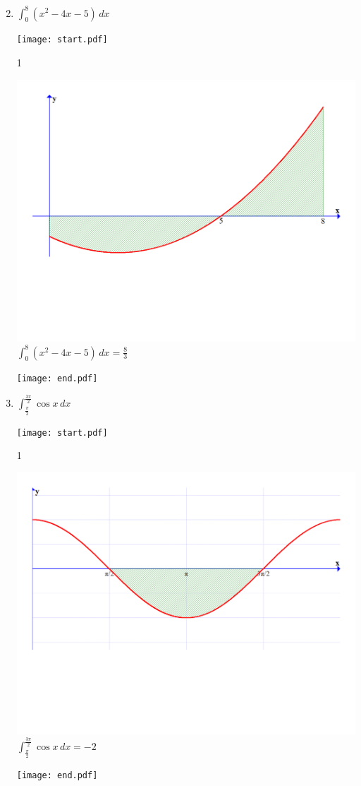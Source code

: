 \documentclass[12pt]{article}
\begin{document}
\newpage


\begin{enumerate}
\setcounter{enumi}{1}

\item $\int_0^8{(x^2-4x-5)}\,dx$

\texttt{[image: start.pdf]}
{{{1\linewidth}{\begin{center}\includegraphics[scale=0.2]{2.pdf}\\
$\int_0^8(x^2-4x-5) \,dx=\frac{8}{3}$\end{center}}}}
\texttt{[image: end.pdf]}


\item $\int_{\frac{\pi}{2}}^{\frac{3\pi}{2}}\cos{x} \,dx$

\texttt{[image: start.pdf]}
{{{1\linewidth}{\begin{center}\includegraphics[scale=0.2]{3.pdf}\\
$\int_{\frac{\pi}{2}}^{\frac{3\pi}{2}}{\cos{x}} \,dx=-2$\end{center}}}}
\texttt{[image: end.pdf]}



\end{enumerate}
\end{document}
